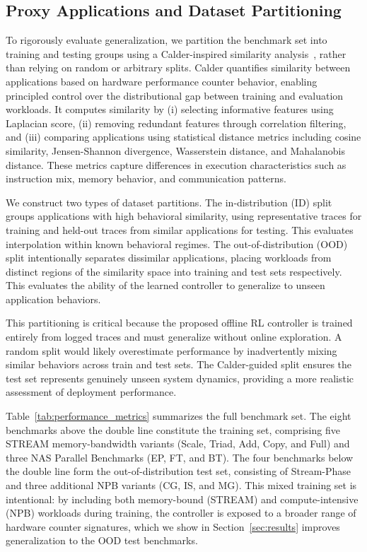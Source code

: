 \subsection{Proxy Applications and Dataset Partitioning}
\label{subsec:proxy_apps}

To rigorously evaluate generalization, we partition the 
benchmark set into training and testing groups using a 
Calder-inspired similarity 
analysis~\cite{chen2025beyondguesscheck}, rather than relying 
on random or arbitrary splits. Calder quantifies similarity 
between applications based on hardware performance counter 
behavior, enabling principled control over the distributional 
gap between training and evaluation workloads. It computes 
similarity by (i) selecting informative features using 
Laplacian score, (ii) removing redundant features through 
correlation filtering, and (iii) comparing applications using 
statistical distance metrics including cosine similarity, 
Jensen-Shannon divergence, Wasserstein distance, and 
Mahalanobis distance. These metrics capture differences in 
execution characteristics such as instruction mix, memory 
behavior, and communication patterns.

We construct two types of dataset partitions. The 
in-distribution (ID) split groups applications with high 
behavioral similarity, using representative traces for training 
and held-out traces from similar applications for testing. This 
evaluates interpolation within known behavioral regimes. The 
out-of-distribution (OOD) split intentionally separates 
dissimilar applications, placing workloads from distinct 
regions of the similarity space into training and test sets 
respectively. This evaluates the ability of the learned 
controller to generalize to unseen application behaviors.

This partitioning is critical because the proposed offline RL 
controller is trained entirely from logged traces and must 
generalize without online exploration. A random split would 
likely overestimate performance by inadvertently mixing similar 
behaviors across train and test sets. The Calder-guided split 
ensures the test set represents genuinely unseen system 
dynamics, providing a more realistic assessment of deployment 
performance.

Table~\ref{tab:performance_metrics} summarizes the full 
benchmark set. The eight benchmarks above the double line 
constitute the training set, comprising five STREAM 
memory-bandwidth variants (Scale, Triad, Add, Copy, and Full) 
and three NAS Parallel Benchmarks (EP, FT, and BT). The four 
benchmarks below the double line form the out-of-distribution 
test set, consisting of Stream-Phase and three additional NPB 
variants (CG, IS, and MG). This mixed training set is 
intentional: by including both memory-bound (STREAM) and 
compute-intensive (NPB) workloads during training, the 
controller is exposed to a broader range of hardware counter 
signatures, which we show in Section~\ref{sec:results} 
improves generalization to the OOD test benchmarks.

